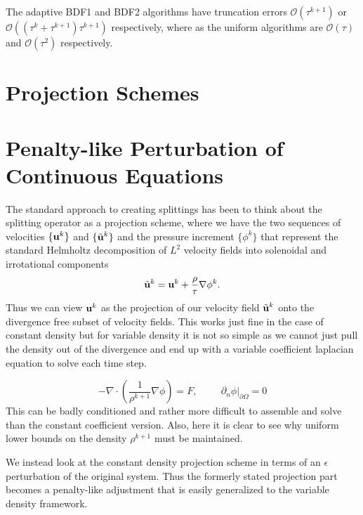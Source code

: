 \documentclass[letterpaper]{erdc}
\begin{document}
The adaptive BDF1 and BDF2 algorithms have truncation errors $\mathcal{O}\left(\tau^{k+1}\right)$ or $\mathcal{O}\left(\left(\tau^{k}+\tau^{k+1} \right)\tau^{k+1} \right)$ respectively, where as the uniform algorithms are $\mathcal{O}(\tau)$ and $\mathcal{O}(\tau^{2})$ respectively.
  

%
%
%
\section{Projection Schemes}


%
%
%
\section{Penalty-like Perturbation of Continuous Equations}
The standard approach to creating splittings has been to think about the splitting operator as a projection scheme, where we have the two sequences of velocities $\{\textbf{u}^{k}\}$ and $\{\tilde{\textbf{u}}^{k}\}$ and the pressure increment $\{\phi^{k}\}$ that represent the standard Helmholtz decomposition of $L^{2}$ velocity fields into solenoidal and irrotational components
\begin{equation}
  \tilde{\textbf{u}}^{k} = \textbf{u}^{k} + \frac{\rho}{\tau}\nabla \phi^{k}.
\end{equation}
Thus we can view $\textbf{u}^{k}$ as the projection of our velocity field $\tilde{\textbf{u}}^{k}$ onto the divergence free subset of velocity fields.  This works just fine in the case of constant density but for variable density it is not so simple as we cannot just pull the density out of the divergence and end up with a variable coefficient laplacian equation to solve each time step.

\begin{equation}
  -\nabla\cdot\left(\frac{1}{\rho^{k+1}} \nabla\phi \right) = F,  \hspace{1cm} \left.\partial_n \phi\right|_{\partial\Omega} = 0
\end{equation}  
This can be badly conditioned and rather more difficult to assemble and solve than the constant coefficient version.  Also, here it is clear to see why uniform lower bounds on the density $\rho^{k+1}$ must be maintained.

We instead look at the constant density projection scheme in terms of an $\epsilon$ perturbation of the original system. Thus the formerly stated projection part becomes a penalty-like adjustment that is easily generalized to the variable density framework.
\end{document}
